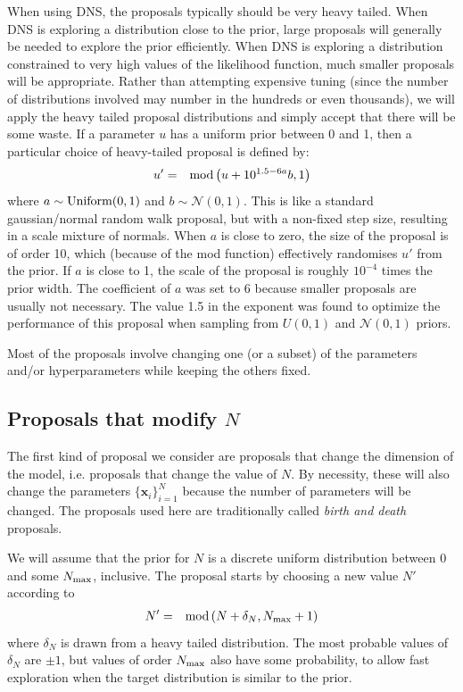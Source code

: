 \documentclass[letterpaper, 11pt]{article}
\newcommand{\xx}{\mathbf{x}}
\begin{document}
When using DNS,
the proposals typically should be very heavy tailed. When
DNS is exploring a distribution close to the prior, large proposals will
generally be needed to explore the prior efficiently.
When DNS is exploring a distribution constrained to
very high values of the likelihood function, much smaller proposals will be
appropriate. Rather than attempting expensive tuning (since the number of
distributions involved may number in the hundreds or even thousands), we will
apply the heavy tailed proposal distributions and simply accept that there will
be some waste. If a parameter $u$ has a uniform prior between 0 and 1, then
a particular choice of heavy-tailed proposal is defined by:
\begin{eqnarray}
u' &=& \textnormal{mod}\left(u + 10^{1.5 - 6a}b, 1\right)
\end{eqnarray}
where $a \sim \textnormal{Uniform}(0, 1)$ and $b\sim \mathcal{N}(0,1)$.
This is like a standard gaussian/normal random walk proposal, but with a
non-fixed step size, resulting in a scale mixture of normals.
When
$a$ is close to zero, the size of the proposal is of order 10, which (because
of the mod function) effectively randomises $u'$ from the prior. If $a$ is
close to 1, the scale of the proposal is roughly $10^{-4}$ times the prior
width. The coefficient of $a$ was set to 6 because smaller proposals are
usually not necessary. The value 1.5 in the exponent was found to optimize the
performance of this proposal when sampling from $U(0, 1)$ and $\mathcal{N}(0,1)$
priors.

Most of the proposals involve changing one (or a subset) of the parameters
and/or hyperparameters while keeping the others fixed.

\subsection{Proposals that modify $N$}\label{sec:proposal1}
The first kind of proposal we consider are proposals that change the
dimension of the model, i.e. proposals that change the value of $N$. By
necessity, these will also change the parameters $\{\xx_i\}_{i=1}^N$ because
the number of parameters will be changed. The proposals used here are
traditionally called {\it birth and death} proposals.

We will assume that the prior for $N$ is a discrete uniform distribution
between 0 and some $N_{\rm max}$, inclusive. The proposal starts by choosing
a new value $N'$ according to
\begin{eqnarray}
N' &=& \textnormal{mod}\left(N + \delta_N, N_{\rm max} + 1\right)
\end{eqnarray}
where $\delta_N$ is drawn from a heavy tailed
distribution. The most probable values of $\delta_N$ are $\pm 1$, but values
of order $N_{\rm max}$ also have some probability, to allow fast exploration
when the target distribution is similar to the prior.
\end{document}
